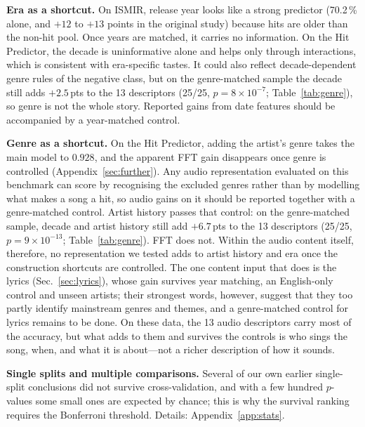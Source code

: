 \documentclass[conference]{IEEEtran}
\newcommand{\pp}{\,pts}
\begin{document}
\textbf{Era as a shortcut.} On ISMIR, release year looks like a strong predictor (70.2\,\%
alone, and $+12$ to $+13$ points in the original study) because hits are older than the
non-hit pool. Once years are matched, it carries no information. On the Hit Predictor, the
decade is uninformative alone and helps only through interactions, which is consistent
with era-specific tastes. It could also reflect decade-dependent genre rules of the negative class, but on the
genre-matched sample the decade still adds $+2.5$\pp{} to the 13 descriptors (25/25, $p=8\times10^{-7}$;
Table~\ref{tab:genre}), so genre is not the whole story. Reported gains from date features should be accompanied by a year-matched control.

\textbf{Genre as a shortcut.} On the Hit Predictor, adding the artist's genre takes the
main model to $0.928$, and the apparent FFT gain disappears once genre is controlled
(Appendix~\ref{sec:further}). Any audio representation evaluated on this benchmark can score
by recognising the excluded genres rather than by modelling what makes a song a hit, so
audio gains on it should be reported together with a genre-matched control. Artist history
passes that control: on the genre-matched sample, decade and artist history still add $+6.7$\pp{} to the 13
descriptors (25/25, $p=9\times10^{-13}$; Table~\ref{tab:genre}). FFT does not. Within the audio content itself, therefore, no
representation we tested adds to artist history and era once the construction shortcuts
are controlled. The one content input that does is the lyrics (Sec.~\ref{sec:lyrics}), whose
gain survives year matching, an English-only control and unseen artists; their strongest words,
however, suggest that they too partly identify mainstream genres and themes, and a genre-matched control
for lyrics remains to be done. On these data, the 13 audio descriptors carry most of the accuracy, but what
adds to them and survives the controls is who sings the song, when, and what it is about---not a richer
description of how it sounds.

\textbf{Single splits and multiple comparisons.} Several of our own earlier single-split conclusions
did not survive cross-validation, and with a few hundred $p$-values some small ones are expected by chance; this is why
the survival ranking requires the Bonferroni threshold. Details: Appendix~\ref{app:stats}.
\end{document}
